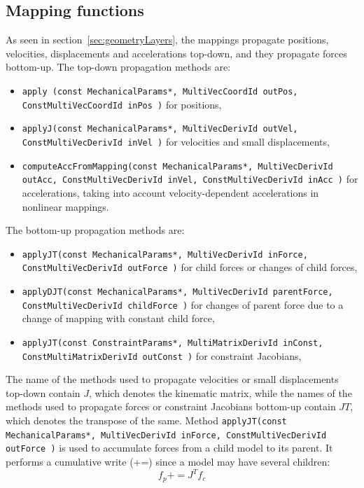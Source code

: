 \subsection{Mapping functions}
As seen in section~\ref{sec:geometryLayers}, the mappings propagate positions, velocities, displacements and accelerations top-down, and they propagate forces bottom-up.
The top-down propagation methods are:
\begin{itemize}
 \item \texttt{apply (const MechanicalParams*, MultiVecCoordId outPos, ConstMultiVecCoordId inPos )} for positions,
 \item \texttt{applyJ(const MechanicalParams*, MultiVecDerivId outVel, ConstMultiVecDerivId inVel )} for velocities and small displacements,
\item \texttt{computeAccFromMapping(const MechanicalParams*, MultiVecDerivId outAcc, ConstMultiVecDerivId inVel, ConstMultiVecDerivId inAcc )} for accelerations, taking into account velocity-dependent accelerations in nonlinear mappings.
\end{itemize}
The bottom-up propagation methods are:
\begin{itemize}
 \item \texttt{applyJT(const MechanicalParams*, MultiVecDerivId inForce, ConstMultiVecDerivId outForce )} for child forces or changes of child forces,
\item \texttt{applyDJT(const MechanicalParams*, MultiVecDerivId parentForce, ConstMultiVecDerivId  childForce )} for changes of parent force due to a change of mapping with constant child force,
\item \texttt{applyJT(const ConstraintParams*, MultiMatrixDerivId inConst, ConstMultiMatrixDerivId outConst )} for constraint Jacobians,
\end{itemize}


The name of the methods used to propagate velocities or small displacements top-down contain $J$, which denotes the kinematic matrix, while the names of the methods used to propagate forces or constraint Jacobians bottom-up contain $JT$, which denotes the transpose of the same.
Method \texttt{applyJT(const MechanicalParams*, MultiVecDerivId inForce, ConstMultiVecDerivId outForce )} is used to accumulate forces from a child model to its parent. It performs a cumulative write (+=) since a model may have several children:
\begin{equation}
 \label{eq.applyjt}
 f_{p} += J^T f_c
\end{equation}


